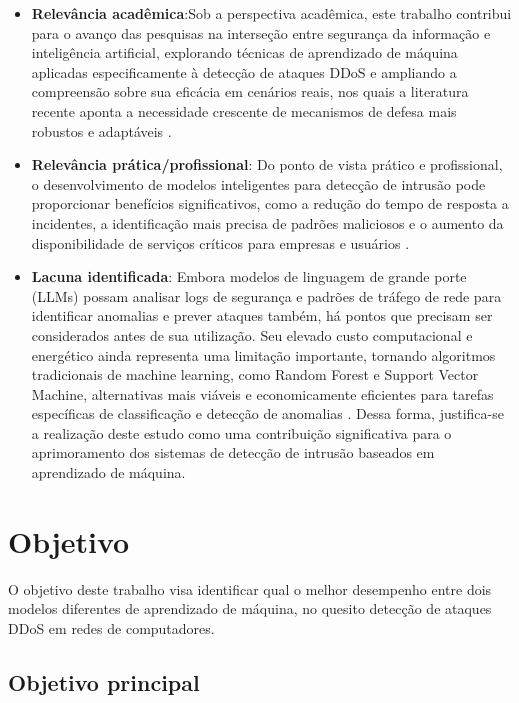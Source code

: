 \documentclass[
    12pt,                %
    openright,           %
    oneside,             %
    a4paper,             %
    english,             %
    brazil               %
]{abntex2}
\begin{document}
\begin{itemize}
    \item \textbf{Relevância acadêmica}:Sob a perspectiva acadêmica, este trabalho contribui para o avanço das pesquisas na interseção entre segurança da informação e inteligência artificial, explorando técnicas de aprendizado de máquina aplicadas especificamente à detecção de ataques DDoS e ampliando a compreensão sobre sua eficácia em cenários reais, nos quais a literatura recente aponta a necessidade crescente de mecanismos de defesa mais robustos e adaptáveis \cite{Ouhssini2024}.
    \item \textbf{Relevância prática/profissional}: Do ponto de vista prático e profissional, o desenvolvimento de modelos inteligentes para detecção de intrusão pode proporcionar benefícios significativos, como a redução do tempo de resposta a incidentes, a identificação mais precisa de padrões maliciosos e o aumento da disponibilidade de serviços críticos para empresas e usuários \cite{Tandon2020}. 
    \item \textbf{Lacuna identificada}: Embora modelos de linguagem de grande porte (LLMs) possam analisar logs de segurança e padrões de tráfego de rede para identificar anomalias e prever ataques também, há pontos que precisam ser considerados antes de sua utilização. Seu elevado custo computacional e energético ainda representa uma limitação importante, tornando algoritmos tradicionais de machine learning, como Random Forest e Support Vector Machine, alternativas mais viáveis e economicamente eficientes para tarefas específicas de classificação e detecção de anomalias \cite{Zschache2026}. Dessa forma, justifica-se a realização deste estudo como uma contribuição significativa para o aprimoramento dos sistemas de detecção de intrusão baseados em aprendizado de máquina.
\end{itemize}

\section{Objetivo}
\label{sec:objetivo}

O objetivo deste trabalho visa identificar qual o melhor desempenho entre dois modelos diferentes de aprendizado de máquina, no quesito detecção de ataques DDoS em redes de computadores.

\subsection{Objetivo principal}
\end{document}
